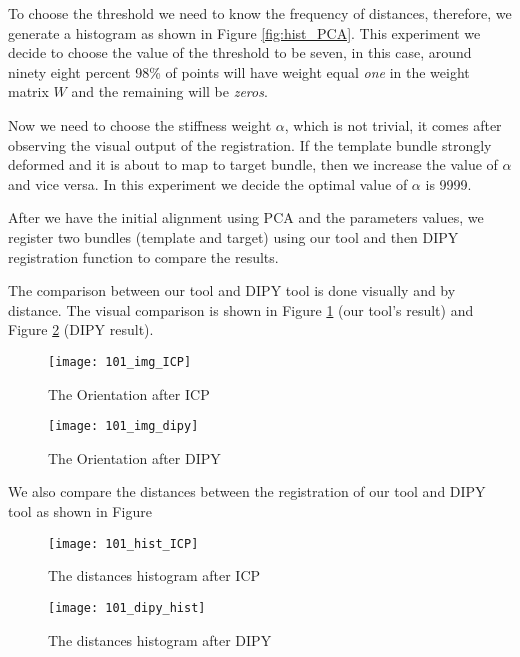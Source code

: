 \documentclass[../structure.tex]{subfiles}
\begin{document}
To choose the threshold we need to know the frequency of distances, therefore, we generate a histogram as shown in Figure \ref{fig:hist_PCA}. This experiment we decide to choose the value of the threshold to be seven, in this case, around ninety eight percent 98\% of points will have weight equal \textit{one} in the weight matrix $W$ and the remaining will be \textit{zeros}.

Now we need to choose the stiffness weight $\alpha$, which is not trivial, it comes after observing the visual output of the registration. If the template bundle strongly deformed and it is about to map to target bundle, then we increase the value of $\alpha$ and vice versa. In this experiment we decide the optimal value of $\alpha$ is 9999.

After we have the initial alignment using PCA and the parameters values, we register two bundles (template and target) using our tool and then DIPY registration function to compare the results.

The comparison between our tool and DIPY tool is done visually and by distance. The visual comparison is shown in Figure \ref{fig:img_ICP} (our tool's result) and Figure \ref{fig:img_dipy} (DIPY result).

\begin{figure}[h!]
\centering
\texttt{[image: 101\_img\_ICP]}
\captionsetup{justification=centering}
\caption{The Orientation after ICP}
\label{fig:img_ICP}
\end{figure}

\begin{figure}[h!]
\centering
\texttt{[image: 101\_img\_dipy]}
\captionsetup{justification=centering}
\caption{The Orientation after DIPY}
\label{fig:img_dipy}
\end{figure}

We also compare the distances between the registration of our tool and DIPY tool as shown in Figure 

\begin{figure}[h!]
\centering
\texttt{[image: 101\_hist\_ICP]}
\captionsetup{justification=centering}
\caption{The distances histogram after ICP}
\label{fig:hist_ICP}
\end{figure}

\begin{figure}[h!]
\centering
\texttt{[image: 101\_dipy\_hist]}
\captionsetup{justification=centering}
\caption{The distances histogram after DIPY}
\label{fig:dipy_hist}
\end{figure}
\end{document}
